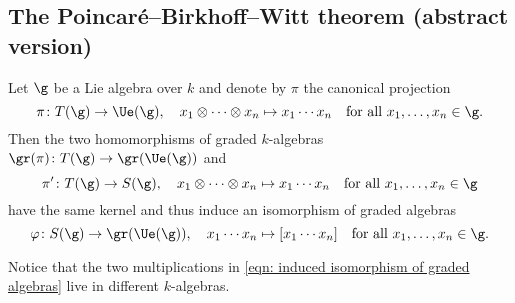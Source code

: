 \subsection{The Poincar\'{e}--Birkhoff--Witt theorem (abstract version)}


\begin{theorem} \label{thrm: pbw abstract}
 Let $\g$ be a Lie algebra over $k$ and denote by $\pi$ the canonical projection
 \[
  \pi \colon T(\g) \to \Ue(\g), \quad
  x_1 \otimes \dotsb \otimes x_n \mapsto x_1 \dotsm x_n
  \quad \text{for all $x_1, \dotsc, x_n \in \g$}.
 \]
 Then the two homomorphisms of graded $k$-algebras $\gr(\pi) \colon T(\g) \to \gr(\Ue(\g))$ and
 \[
  \pi' \colon T(\g) \to S(\g), \quad 
  x_1 \otimes \dotsb \otimes x_n \mapsto x_1 \dotsm x_n
  \quad \text{for all $x_1, \dotsc, x_n \in \g$}
 \]
 have the same kernel and thus induce an isomorphism of graded algebras
 \begin{equation}\label{eqn: induced isomorphism of graded algebras}
  \varphi \colon S(\g) \to \gr(\Ue(\g)), \quad
  x_1 \dotsm x_n \mapsto [x_1 \dotsm x_n]
  \quad \text{for all $x_1, \dotsc, x_n \in \g$}.
 \end{equation}
\end{theorem}


\begin{remark}
 Notice that the two multiplications in \eqref{eqn: induced isomorphism of graded algebras} live in different $k$-algebras.
\end{remark}


